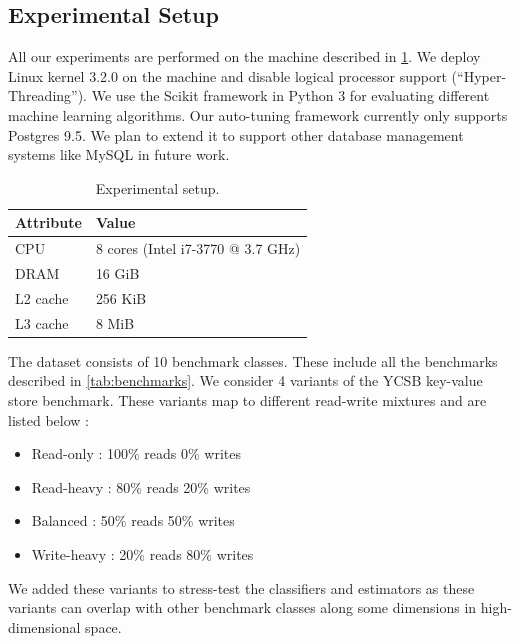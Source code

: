 \subsection{Experimental Setup}
\label{sec:setup}

All our experiments are performed on the machine described in \cref{tab:setup}.
We deploy Linux kernel 3.2.0 on the machine and disable logical processor
support (“Hyper-Threading”).
We use the Scikit \citep{scikit-learn} framework in Python 3 for
evaluating different machine learning algorithms.
Our auto-tuning framework currently only supports Postgres 9.5. We plan to
extend it to support other database management systems like MySQL in future
work.

\begin{table}
\centering
\small{
  \centering
  \begin{tabular}{l|l} 
	\toprule
   		Attribute &  Value  \\    
    \midrule
		CPU   &   8 cores (Intel i7-3770 @ 3.7 GHz)  \\
		DRAM   &  16 GiB  \\
		L2 cache  &  256 KiB  \\
		L3 cache  &  8 MiB  \\		
   \bottomrule
   \end{tabular}
 }
\caption{Experimental setup.}
\label{tab:setup}
\end{table}

The dataset consists of 10 benchmark classes. These include all the benchmarks
described in \cref{tab:benchmarks}. We consider 4 variants of the YCSB key-value
store benchmark. These variants map to different read-write mixtures and are
listed below :

\begin{itemize}
  \item {Read-only : 100\% reads 0\% writes } 
  \item {Read-heavy : 80\% reads 20\% writes } 
  \item {Balanced : 50\% reads 50\% writes } 
  \item {Write-heavy : 20\% reads 80\% writes } 
\end{itemize}

We added these variants to stress-test the classifiers and estimators as these
variants can overlap with other benchmark classes along some dimensions in
high-dimensional space. 

